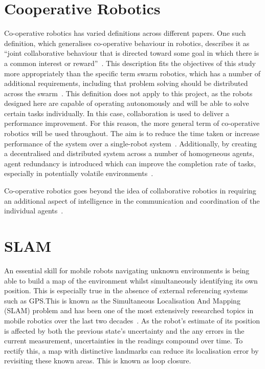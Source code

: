 
\section{Cooperative Robotics}\label{litreview/coop}
Co-operative robotics has varied definitions across different papers. One such
definition, which generalises co-operative behaviour in robotics, describes it as ``joint
collaborative behaviour that is directed toward some goal in which there is a
common interest or reward''~\cite{barnes1991behaviour}. This description fits the
objectives of this study more appropriately than the specific term swarm robotics, which
has a number of additional requirements, including
that problem solving should be distributed across the swarm~\cite{sahin04}.
This definition does not apply to this project, as the robots designed
here are capable of operating autonomously and will be able to solve certain tasks
individually. In this case, collaboration is used to deliver a performance improvement.
For this reason, the more general term of co-operative robotics will
be used throughout. The aim is to reduce the time taken or increase performance of the system over
a single-robot system~\cite{premvuti1990consideration}. Additionally, by creating a decentralised
and distributed system across a number of homogeneous agents, agent redundancy is introduced which
can improve the completion rate of tasks, especially in potentially volatile
environments~\cite{beckers1994local, parker95}.

Co-operative robotics goes beyond the idea
of collaborative robotics in requiring an additional aspect of intelligence in
the communication and coordination of the individual agents~\cite{cao1995cooperative}.

\section{SLAM}\label{litreview/slam}
An essential skill for mobile robots navigating unknown environments is being
able to build a map of the environment whilst simultaneously identifying its own
position. This is especially true in the absence of external referencing systems
such as GPS.\@ This is known as the Simultaneous Localisation And Mapping (SLAM)
problem and has been one of the most extensively researched topics in mobile
robotics over the last two decades~\cite{grisetti2010tutorial}. As the robot's
estimate of its position is affected by both the previous state's uncertainty
and the any errors in the current measurement, uncertainties in the readings compound
over time. To rectify this, a map with distinctive landmarks can reduce its
localisation error by revisiting these known areas. This is known as loop closure.

